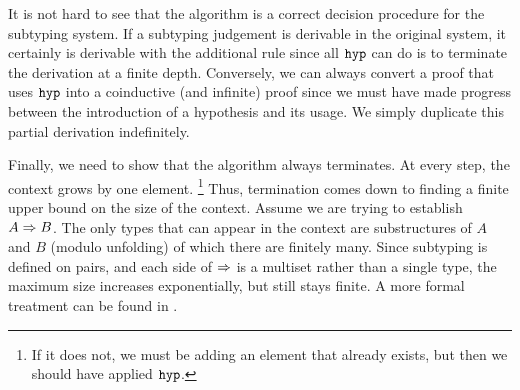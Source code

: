 It is not hard to see that the algorithm is a correct decision procedure for the subtyping system. If a subtyping judgement is derivable in the original system, it certainly is derivable with the additional rule since all $\texttt{hyp}$ can do is to terminate the derivation at a finite depth. Conversely, we can always convert a proof that uses $\texttt{hyp}$ into a coinductive (and infinite) proof since we must have made progress between the introduction of a hypothesis and its usage. We simply duplicate this partial derivation indefinitely.

Finally, we need to show that the algorithm always terminates. At every step, the context grows by one element.%
\footnote{If it does not, we must be adding an element that already exists, but then we should have applied $\texttt{hyp}$.}
Thus, termination comes down to finding a finite upper bound on the size of the context. Assume we are trying to establish $A \mathrel\Rightarrow B$. The only types that can appear in the context are substructures of $A$ and $B$ (modulo unfolding) of which there are finitely many. Since subtyping is defined on pairs, and each side of $\mathrel\Rightarrow$ is a multiset  rather than a single type, the maximum size increases exponentially, but still stays finite. A more formal treatment can be found in \cite{StoneS05}. 

